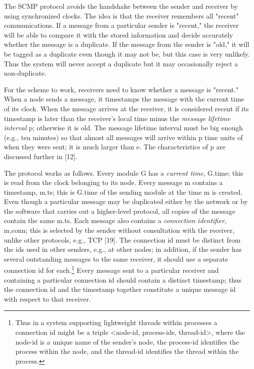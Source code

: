 \documentclass[a4paper,11pt,notitlepage,twoside,openright]{article}
\begin{document}
The SCMP protocol avoids the handshake between the sender and receiver
by using synchronized clocks. The idea is that the receiver remembers
all "recent" communications. If a message from a particular sender is
"recent," the receiver will be able to compare it with the stored
information and decide accurately whether the message is a duplicate. If
the message from the sender is "old," it will be tagged as a duplicate
even though it may not be, but this case is very unlikely. Thus the
system will never accept a duplicate but it may occasionally reject a
non-duplicate.

For the scheme to work, receivers need to know whether a message is
"recent." When a node sends a message, it timestamps the message with
the current time of its clock. When the message arrives at the receiver,
it is considered recent if its timestamp is later than the receiver's
local time minus the \emph{message lifetime interval} p; otherwise it is
old. The message lifetime interval must be big enough (e.g., ten
minutes) so that almost all messages will arrive within p time units of
when they were sent; it is much larger than e. The characteristics of p
are discussed further in {[}12{]}.

The protocol works as follows. Every module G has a \emph{current time},
G.time; this is read from the clock belonging to its node. Every message
m contains a timestamp, m.ts; this is G.time of the sending module at
the time m is created. Even though a particular message may be
duplicated either by the network or by the software that carries out a
higher-level protocol, all copies of the message contain the same m.ts.
Each message also contains a \emph{connection identifier}, m,conn; this
is selected by the sender without consultation with the receiver, unlike
other protocols, e.g., TCP {[}19{]}. The connection id must be distinct
from the ids used in other senders, e.g., at other nodes; in addition,
if the sender has several outstanding messages to the same receiver, it
should use a separate connection id for each.\footnote{Thus in a system
  supporting lightweight threads within processes a connection id might
  be a triple \textless{}node-id, process-ids, thread-id\textgreater{},
  where the node-id is a unique name of the sender's node, the
  process-id identifies the process within the node, and the thread-id
  identifies the thread within the process.} Every message sent to a
particular receiver and containing a particular connection id should
contain a distinct timestamp; thus the connection id and the timestamp
together constitute a unique message id with respect to that receiver.
\end{document}
